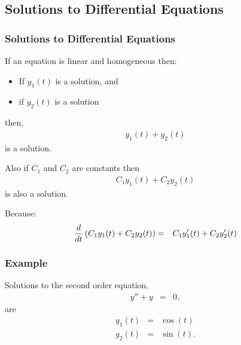 \subsection{Solutions to Differential Equations}

\begin{frame}
  \frametitle{Solutions to Differential Equations}

  If an equation is linear and homogeneous then:
  \begin{itemize}
  \item If $y_1(t)$ is a solution, and
  \item if $y_2(t)$ is a solution
  \end{itemize}

  then,
  \begin{eqnarray*}
    y_1(t) + y_2(t)
  \end{eqnarray*}
  is a solution.

  Also if $C_1$ and $C_2$ are constants then
  \begin{eqnarray*}
    C_1 y_1(t) + C_2 y_2(t)
  \end{eqnarray*}
  is also a solution.

  Because:
  \begin{eqnarray*}
    \frac{d}{dt} \left( C_1 y_1(t) + C_2 y_2(t) \right) & = &
    C_1 y_1'(t) + C_2 y_2'(t)
  \end{eqnarray*}


\end{frame}


\begin{frame}
  \frametitle{Example}

  Solutions to the second order equation,
  \begin{eqnarray*}
    y'' + y & = & 0,
  \end{eqnarray*}
  are
  \begin{eqnarray*}
    y_1(t) & = & \cos(t) \\
    y_2(t) & = & \sin(t).
  \end{eqnarray*}


\end{frame}

